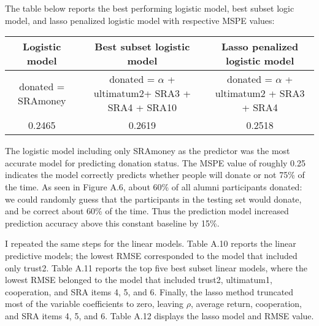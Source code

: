 \documentclass[12pt]{article}
\begin{document}
The table below reports the best performing logistic model, best subset logic model, and lasso penalized logistic model with respective MSPE values:

\vspace{5mm} \begin{adjustbox}{width=\textwidth}
\begin{tabular}{ c | c | c }
\hline \hline
Logistic model & Best subset logistic model & Lasso penalized logistic model \\ 
\hline
\small donated = SRAmoney & donated = \(\alpha\) + ultimatum2+ SRA3 + SRA4 + SRA10 & donated = \(\alpha\) + ultimatum2 + SRA3 + SRA4 \\
 \hline
 0.2465 & 0.2619 & 0.2518 \\  
 \hline \hline
\end{tabular}
\end{adjustbox}

\vspace{5mm} The logistic model including only SRAmoney as the predictor was the most accurate model for predicting donation status. The MSPE value of roughly 0.25 indicates the model correctly predicts whether people will donate or not 75\% of the time. As seen in Figure A.6, about 60\% of all alumni participants donated: we could randomly guess that the participants in the testing set would donate, and be correct about 60\% of the time. Thus the prediction model increased prediction accuracy above this constant baseline by 15\%.

I repeated the same steps for the linear models. Table A.10 reports the linear predictive models; the lowest RMSE corresponded to the model that included only trust2. Table A.11 reports the top five best subset linear models, where the lowest RMSE belonged to the model that included trust2, ultimatum1, cooperation, and SRA items 4, 5, and 6. Finally, the lasso method truncated most of the variable coefficients to zero, leaving \(\rho\), average return, cooperation, and SRA items 4, 5, and 6. Table A.12 displays the lasso model and RMSE value.

\end{document}
